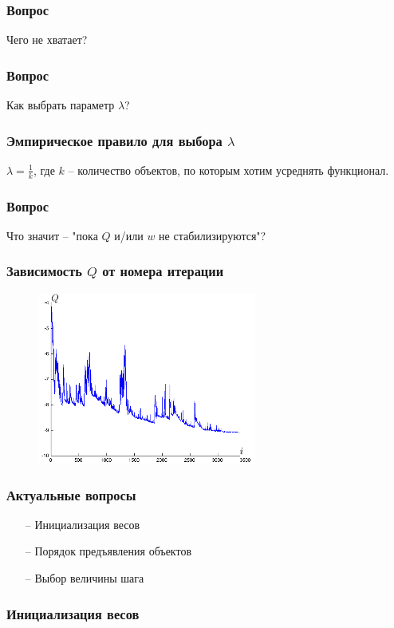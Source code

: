 \documentclass[12pt]{beamer}
\begin{document}
\begin{frame}\frametitle{Вопрос}
Чего не хватает?
\end{frame}

\begin{frame}\frametitle{Вопрос}
Как выбрать параметр $\lambda$?
\end{frame}

\begin{frame}\frametitle{Эмпирическое правило для выбора $\lambda$}
$\lambda = \frac{1}{k}$, где $k$ -- количество объектов, по которым хотим усреднять функционал.
\end{frame}

\begin{frame}\frametitle{Вопрос}
Что значит -- "пока $Q$ и/или $w$ не стабилизируются"?
\end{frame}

\begin{frame}\frametitle{Зависимость $Q$ от номера итерации}
\begin{figure}[htbp]
  \includegraphics[height=160pt, keepaspectratio = true]{images/stochastic_gradient}   
\end{figure}
\end{frame}

\begin{frame}\frametitle{Актуальные вопросы}
\begin{itemize}
\item[--] Инициализация весов
\item[--] Порядок предъявления объектов
\item[--] Выбор величины шага
\end{itemize}
\end{frame}

\begin{frame}\frametitle{Инициализация весов}

\end{frame}
\end{document}
